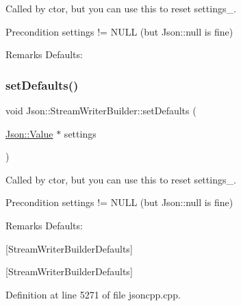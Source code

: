 Called by ctor, but you can use this to reset settings\+\_\+. \begin{DoxyPrecond}{Precondition}
\textquotesingle{}settings\textquotesingle{} != N\+U\+LL (but Json\+::null is fine) 
\end{DoxyPrecond}
\begin{DoxyRemark}{Remarks}
Defaults\+: 
\begin{DoxyCodeInclude}
\end{DoxyCodeInclude}

\end{DoxyRemark}
\hypertarget{class_json_1_1_stream_writer_builder_a53bf106b141e28637b01ad0ecd2acbf6}{}\label{class_json_1_1_stream_writer_builder_a53bf106b141e28637b01ad0ecd2acbf6} 
\subsubsection{\texorpdfstring{set\+Defaults()}{setDefaults()}\hspace{0.1cm}{\footnotesize\ttfamily [2/2]}}
{\footnotesize\ttfamily void Json\+::\+Stream\+Writer\+Builder\+::set\+Defaults (\begin{DoxyParamCaption}\item[{\hyperlink{class_json_1_1_value}{Json\+::\+Value} $\ast$}]{settings }\end{DoxyParamCaption})\hspace{0.3cm}{\ttfamily [static]}}

Called by ctor, but you can use this to reset settings\+\_\+. \begin{DoxyPrecond}{Precondition}
\textquotesingle{}settings\textquotesingle{} != N\+U\+LL (but Json\+::null is fine) 
\end{DoxyPrecond}
\begin{DoxyRemark}{Remarks}
Defaults\+: 
\begin{DoxyCodeInclude}
\end{DoxyCodeInclude}

\end{DoxyRemark}
\mbox{[}Stream\+Writer\+Builder\+Defaults\mbox{]}

\mbox{[}Stream\+Writer\+Builder\+Defaults\mbox{]} 

Definition at line 5271 of file jsoncpp.\+cpp.

\hypertarget{class_json_1_1_stream_writer_builder_a12353b97766841db7d049da84658da09}{}\label{class_json_1_1_stream_writer_builder_a12353b97766841db7d049da84658da09} 

